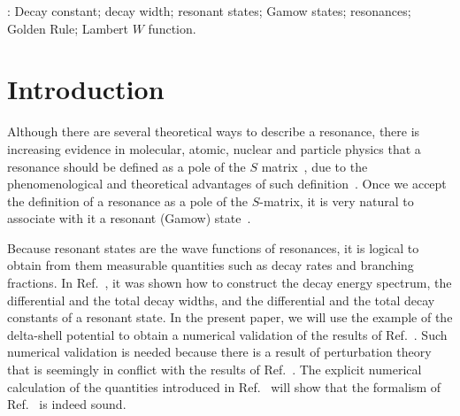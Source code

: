 \documentclass[12pt]{article}
\begin{document}
: Decay constant; decay width; resonant 
states; Gamow states; resonances; Golden Rule; Lambert $W$ function.




       




\newpage






 




\section{Introduction}
\setcounter{equation}{0}
\label{sec:intro}




Although there are several theoretical ways to describe a resonance, there is
increasing evidence in molecular, atomic, nuclear and particle physics that
a resonance should be defined as a pole of the $S$ 
matrix~\cite{TAYLOR}, due to the phenomenological and theoretical 
advantages of such definition~\cite{SIRLIN,WILLENBROCK,STUART,LEIKE,BERNICHA,
CASO,BS,ELANDER1,ELANDER3,GEGELIA,ELANDER4,CECI2,CECI1,TIATOR13,PDG,TIATOR2,
Vaandrager,TIATOR3}. Once we accept the definition of a resonance as
a pole of the $S$-matrix, it is very natural to associate with it a 
resonant (Gamow) state~\cite{GAMOW,SIEGERT,ZELDOVICH,BERGGREN,PESKIN,BOLLINI1,
TOLSTIKHIN1,MONDRAGON00,05CJP,TOLSTIKHIN2,TOLSTIKHIN3,VELAZQUEZ,NPA08,MICHEL7,
NIMROD,GASTON10,SASADA,GASTON11,GASTON12,GASTON13,FOSSEZ,ANDERSEN,JULVE14,
HATANO14,GASTONPRA14,SARA,LUNDMARK,GENTILINI,NPA15,
GASTON16,BROWN16,PLASTINO1,PLASTINO2,CEVIK,GARMON,OLENDSKI,GASTON17}. 

Because resonant states are the wave functions
of resonances, it is logical to obtain from them measurable quantities such
as decay rates and branching fractions. In Ref.~\cite{NPA15}, it was 
shown how to construct the decay energy spectrum, the differential 
and the total decay widths, and the differential and the total decay 
constants of a resonant state. In
the present paper, we will use the example of the delta-shell potential
to obtain a numerical validation of the results of Ref.~\cite{NPA15}. Such 
numerical validation is needed because there is a result of
perturbation theory~\cite{DUNCAN} that is seemingly in
conflict with the results of Ref.~\cite{NPA15}. The explicit numerical 
calculation of the quantities introduced in Ref.~\cite{NPA15} will show that
the formalism of Ref.~\cite{NPA15} is indeed sound.
\end{document}
